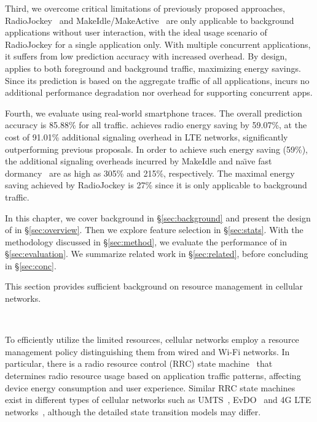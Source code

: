 Third, we overcome critical limitations of previously proposed approaches, \ie RadioJockey~\cite{radiojockey} and MakeIdle/MakeActive~\cite{makeidle} are only applicable to background applications without user interaction, with 
the ideal usage scenario of RadioJockey for a single application only. With multiple concurrent applications, it suffers from low prediction accuracy with increased overhead. By design, \NAME applies to both foreground and background traffic, maximizing energy savings. Since its prediction is based on the aggregate traffic of all applications, \NAME incurs no additional performance degradation nor overhead for supporting concurrent apps.


Fourth, we evaluate \NAME using real-world smartphone traces. The overall prediction accuracy is 85.88\% for all traffic. \NAME achieves radio energy saving by 59.07\%, at the cost of 91.01\% additional signaling overhead in LTE networks, significantly outperforming previous proposals. In order to achieve such energy saving (59\%), the additional signaling overheads incurred by MakeIdle and na\"{\i}ve fast dormancy~\cite{fast.dormancy.1, fast.dormancy.2} are as high as 305\% and 215\%, respectively. The maximal energy saving achieved by RadioJockey is 27\% since it is only applicable to background traffic.


In this chapter, we cover background in \S\ref{sec:background} and present the design of \NAME in \S\ref{sec:overview}. Then we explore feature selection in \S\ref{sec:stats}. With the methodology discussed in \S\ref{sec:method}, we evaluate the performance of \NAME in \S\ref{sec:evaluation}. We summarize related work in \S\ref{sec:related}, before concluding in \S\ref{sec:conc}.





\label{sec:background}

This section provides sufficient background on resource management in cellular networks.

\begin{figure}[t]
\centering
{}\\
\label{fig:rrc}
\end{figure}

To efficiently utilize the limited resources, cellular networks employ a resource management policy distinguishing them from wired and Wi-Fi networks. In particular, there is a radio resource control (RRC) state machine~\cite{imc.3g} that determines radio resource usage based on application traffic patterns, affecting device energy consumption and user experience. Similar RRC state machines exist in different types of cellular networks such as UMTS~\cite{imc.3g}, EvDO~\cite{ChatterjeeD02} and 4G LTE networks~\cite{huang_mobisys12}, although the detailed state transition models may differ.

